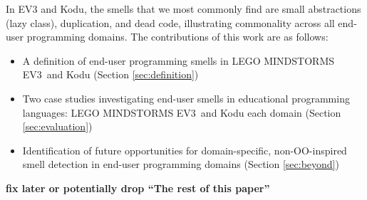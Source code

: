 \documentclass[conference]{IEEEtran}
\newcommand{\ms}{LEGO MINDSTORMS EV3}
\newcommand{\todo}[1]{\textbf{#1}}
\begin{document}
In EV3 and Kodu, the smells that we most commonly find are small abstractions (lazy class), duplication, and dead code, illustrating commonality across all end-user programming domains. The contributions of this work are as follows:

\begin{itemize} \itemsep -0.25pt
	\item A definition of end-user programming smells in \ms~and Kodu  (Section \ref{sec:definition})
	\item Two case studies investigating end-user smells in educational programming languages: \ms~and Kodu each domain  (Section \ref{sec:evaluation})
	\item Identification of future opportunities for domain-specific, non-OO-inspired smell detection in end-user programming domains (Section \ref {sec:beyond})
\end{itemize}

\todo{fix later or potentially drop ``The rest of this paper''}
\end{document}
